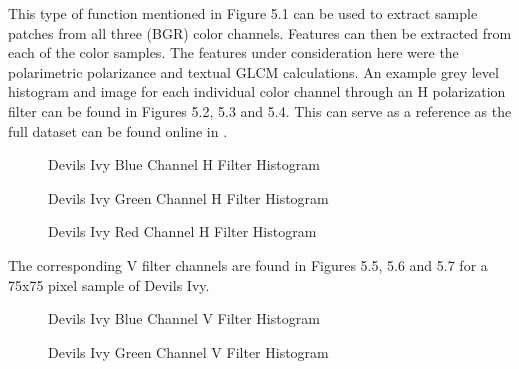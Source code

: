 This type of function mentioned in Figure 5.1 can be used to extract sample patches from all three (BGR) color channels. Features can then be extracted from each of the color samples.  The features under consideration here were the polarimetric polarizance and textual GLCM calculations.   An example grey level histogram and image for each individual color channel through an H polarization filter can be found in Figures 5.2, 5.3 and 5.4.  This can serve as a reference as the full dataset can be found online in \cite{noob}.
\begin{figure}
    \begin{center}
    \end{center}
    \caption{Devils Ivy Blue Channel H Filter Histogram}
    \label{fig:polarization}
\end{figure}
\begin{figure}
    \begin{center}
    \end{center}
    \caption{Devils Ivy Green Channel H Filter Histogram}
    \label{fig:polarization}
\end{figure}
\begin{figure}
    \begin{center}
    \end{center}
    \caption{Devils Ivy Red Channel H Filter Histogram}
    \label{fig:polarization}
\end{figure}
The corresponding V filter channels are found in Figures 5.5, 5.6 and 5.7 for a 75x75 pixel sample of Devils Ivy.
\begin{figure}
    \begin{center}
    \end{center}
    \caption{Devils Ivy Blue Channel V Filter Histogram}
    \label{fig:polarization}
\end{figure}
\begin{figure}
    \begin{center}
    \end{center}
    \caption{Devils Ivy Green Channel V Filter Histogram}
    \label{fig:polarization}
\end{figure}
